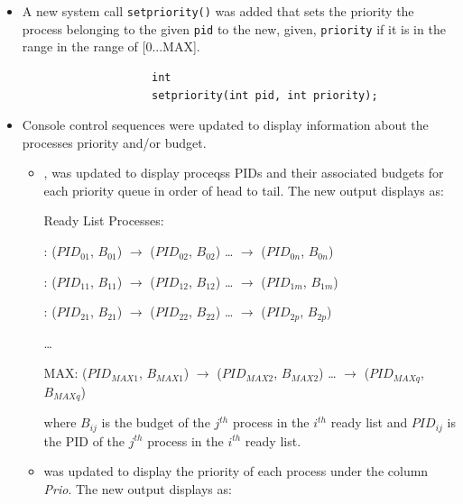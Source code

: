 \documentclass[11pt,letterpaper]{report}
\begin{document}
	\begin{itemize}
	
	\item A new system call {\tt setpriority()} was added that sets the priority the process belonging to the given {\tt pid} to the new, given, {\tt priority} if 
		it is in the range in the range of [0...MAX].
				\begin{verbatim}
					int
					setpriority(int pid, int priority);
				\end{verbatim}
	 		
	\item Console control sequences were updated to display information about the processes priority and/or budget.
	
	\begin{itemize}
	
		\item {}, was updated to display proceqss PIDs and their associated budgets for each priority queue in order of head to tail. The new output displays as:

\newcommand{\arrw}[0]{$\rightarrow${}}

\newcommand{\headr}[2]{(${PID}_{#1#2}$, $B_{#1#2}$)}
\newcommand{\nextr}[2]{\arrw{} \headr{#1}{#2}}

\newcommand{\lvlr}[2]{
	\noindent
	#1: \headr{#1}{1} \nextr{#1}{2} \ldots{} \nextr{#1}{#2}
}

\newcommand{\nextlvlr}[2]{
	\hspace*{\fill}
	
	\lvlr{#1}{#2}	
}

\hspace*{\fill}

\noindent
Ready List Processes:

\lvlr{0}{n}

\nextlvlr{1}{m}

\nextlvlr{2}{p}

\noindent
\ldots

\lvlr{MAX}{q}

\hspace*{\fill}

\noindent
where $B_{ij}$ is the budget of the $j^{th}$ process in the $i^{th}$ ready list and $PID_{ij}$ is the PID of the $j^{th}$ process in the $i^{th}$ ready list.


 		\item {} was updated to display the priority of each process under the column \emph{Prio}. The new output displays as:
		

\end{itemize}
\end{itemize}
\end{document}
